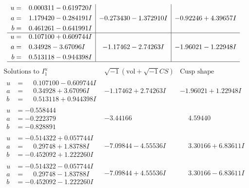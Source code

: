 \documentclass[1p]{elsarticle_modified}
\theoremstyle{definition}
\newcommand{\I}{\sqrt{-1}}
\begin{document}
$$\begin{array}{c|c|c}
\begin{aligned}
u &= \phantom{-}0.000311 - 0.619720 I \\
a &= \phantom{-}1.179420 - 0.284191 I \\
b &= \phantom{-}0.461261 - 0.641991 I\end{aligned}
 & -0.273430 - 1.372910 I & -0.92246 + 4.39657 I \\ \hline\begin{aligned}
u &= \phantom{-}0.107100 + 0.609744 I \\
a &= \phantom{-}0.34928 - 3.67096 I \\
b &= \phantom{-}0.513118 - 0.944398 I\end{aligned}
 & -1.17462 - 2.74263 I & -1.96021 - 1.22948 I\\
 \hline 
 \end{array}$$\newpage$$\begin{array}{c|c|c}  
\text{Solutions to }I^u_{1}& \I (\text{vol} + \sqrt{-1}CS) & \text{Cusp shape}\\
 \hline 
\begin{aligned}
u &= \phantom{-}0.107100 - 0.609744 I \\
a &= \phantom{-}0.34928 + 3.67096 I \\
b &= \phantom{-}0.513118 + 0.944398 I\end{aligned}
 & -1.17462 + 2.74263 I & -1.96021 + 1.22948 I \\ \hline\begin{aligned}
u &= -0.558444\phantom{ +0.000000I} \\
a &= -0.222379\phantom{ +0.000000I} \\
b &= -0.828891\phantom{ +0.000000I}\end{aligned}
 & -3.44166\phantom{ +0.000000I} & \phantom{-}4.59440\phantom{ +0.000000I} \\ \hline\begin{aligned}
u &= -0.514322 + 0.057744 I \\
a &= \phantom{-}0.29748 + 1.83788 I \\
b &= -0.452092 + 1.222260 I\end{aligned}
 & -7.09844 - 4.55536 I & \phantom{-}3.30166 + 6.83611 I \\ \hline\begin{aligned}
u &= -0.514322 - 0.057744 I \\
a &= \phantom{-}0.29748 - 1.83788 I \\
b &= -0.452092 - 1.222260 I\end{aligned}
 & -7.09844 + 4.55536 I & \phantom{-}3.30166 - 6.83611 I \\ \hline\begin{aligned}

\end{aligned}
\end{array}$$
\end{document}
